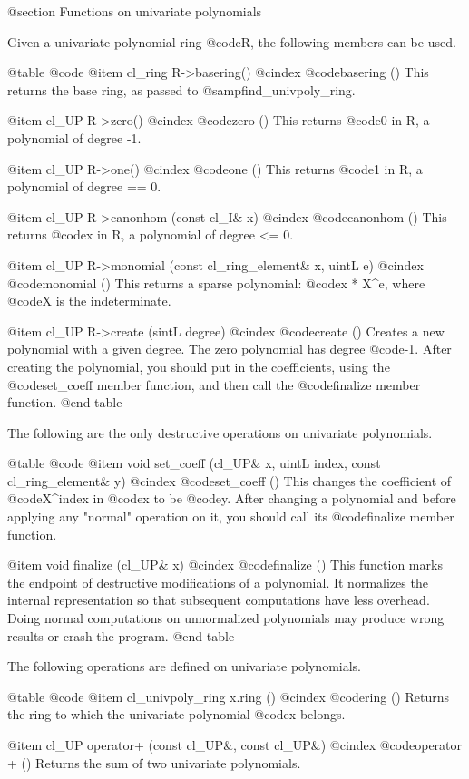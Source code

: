 @section Functions on univariate polynomials

Given a univariate polynomial ring @code{R}, the following members can be used.

@table @code
@item cl_ring R->basering()
@cindex @code{basering ()}
This returns the base ring, as passed to @samp{find_univpoly_ring}.

@item cl_UP R->zero()
@cindex @code{zero ()}
This returns @code{0 in R}, a polynomial of degree -1.

@item cl_UP R->one()
@cindex @code{one ()}
This returns @code{1 in R}, a polynomial of degree == 0.

@item cl_UP R->canonhom (const cl_I& x)
@cindex @code{canonhom ()}
This returns @code{x in R}, a polynomial of degree <= 0.

@item cl_UP R->monomial (const cl_ring_element& x, uintL e)
@cindex @code{monomial ()}
This returns a sparse polynomial: @code{x * X^e}, where @code{X} is the
indeterminate.

@item cl_UP R->create (sintL degree)
@cindex @code{create ()}
Creates a new polynomial with a given degree. The zero polynomial has degree
@code{-1}. After creating the polynomial, you should put in the coefficients,
using the @code{set_coeff} member function, and then call the @code{finalize}
member function.
@end table

The following are the only destructive operations on univariate polynomials.

@table @code
@item void set_coeff (cl_UP& x, uintL index, const cl_ring_element& y)
@cindex @code{set_coeff ()}
This changes the coefficient of @code{X^index} in @code{x} to be @code{y}.
After changing a polynomial and before applying any "normal" operation on it,
you should call its @code{finalize} member function.

@item void finalize (cl_UP& x)
@cindex @code{finalize ()}
This function marks the endpoint of destructive modifications of a polynomial.
It normalizes the internal representation so that subsequent computations have
less overhead. Doing normal computations on unnormalized polynomials may
produce wrong results or crash the program.
@end table

The following operations are defined on univariate polynomials.

@table @code
@item cl_univpoly_ring x.ring ()
@cindex @code{ring ()}
Returns the ring to which the univariate polynomial @code{x} belongs.

@item cl_UP operator+ (const cl_UP&, const cl_UP&)
@cindex @code{operator + ()}
Returns the sum of two univariate polynomials.

